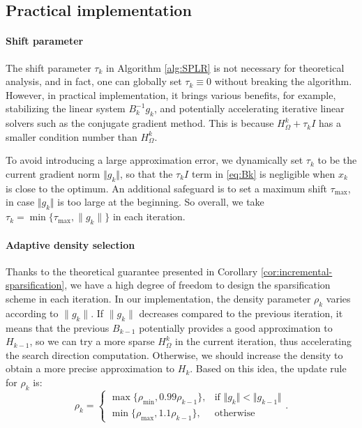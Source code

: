 \documentclass{article}
\theoremstyle{plain}
\theoremstyle{definition}
\theoremstyle{remark}
\begin{document}
\subsection{Practical implementation}
\paragraph{Shift parameter}
The shift parameter $\tau_k$ in Algorithm \ref{alg:SPLR} is not necessary for theoretical analysis, and in fact, one can globally set $\tau_k\equiv 0$ without breaking the algorithm. However, in practical implementation, it brings various benefits, for example, stabilizing the linear system $B_k^{-1}g_k$, and potentially accelerating iterative linear solvers such as the conjugate gradient method. This is because $H_{\Omega}^k + \tau_k I$ has a smaller condition number than $H_{\Omega}^k$.

To avoid introducing a large approximation error, we dynamically set $\tau_k$ to be the current gradient norm $\Vert g_k\Vert$, so that the $\tau_k I$ term in \eqref{eq:Bk} is negligible when $x_k$ is close to the optimum. An additional safeguard is to set a maximum shift $\tau_{\max}$, in case $\Vert g_k \Vert$ is too large at the beginning. So overall, we take $\tau_k = \min\{\tau_{\max}, \|g_k\|\}$ in each iteration.

\paragraph{Adaptive density selection}
Thanks to the theoretical guarantee presented in Corollary \ref{cor:incremental-sparsification}, we have a high degree of freedom to design the sparsification scheme in each iteration.
In our implementation, the density parameter $\rho_k$ varies according to $\|g_k\|$. If $\|g_k\|$ decreases compared to the previous iteration, it means that the previous $B_{k-1}$ potentially provides a good approximation to $H_{k-1}$, so we can try a more sparse $H_{\Omega}^{k}$ in the current iteration, thus accelerating the search direction computation.
Otherwise, we should increase the density to obtain a more precise approximation to $H_k$. Based on this idea, the update rule for $\rho_k$ is:
\begin{equation}
\label{eq:update-rho}
\rho_{k}=\begin{cases}
\max\{\rho_{\min},0.99\rho_{k-1}\}, & \text{if }\Vert g_{k}\Vert<\Vert g_{k-1}\Vert\\
\min\{\rho_{\max},1.1\rho_{k-1}\}, & \text{otherwise}
\end{cases}.
\end{equation}
\end{document}
